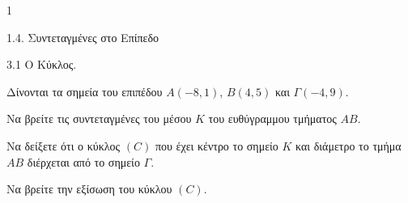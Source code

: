 \begin{ylh}{1}
    \item 1.4. Συντεταγμένες στο Επίπεδο
    \item 3.1 Ο Κύκλος.
\end{ylh}
Δίνονται τα σημεία του επιπέδου $A(-8, 1)$, $B(4, 5)$ και $\Gamma(-4, 9)$.
\begin{alist}
\item Να βρείτε τις συντεταγμένες του μέσου $K$ του ευθύγραμμου τμήματος $AB$. 
\item Να δείξετε ότι ο κύκλος $(C)$ που έχει κέντρο το σημείο $K$ και διάμετρο το τμήμα $AB$ διέρχεται από το σημείο $\Gamma$. 
\item Να βρείτε την εξίσωση του κύκλου $(C)$. 
\end{alist}